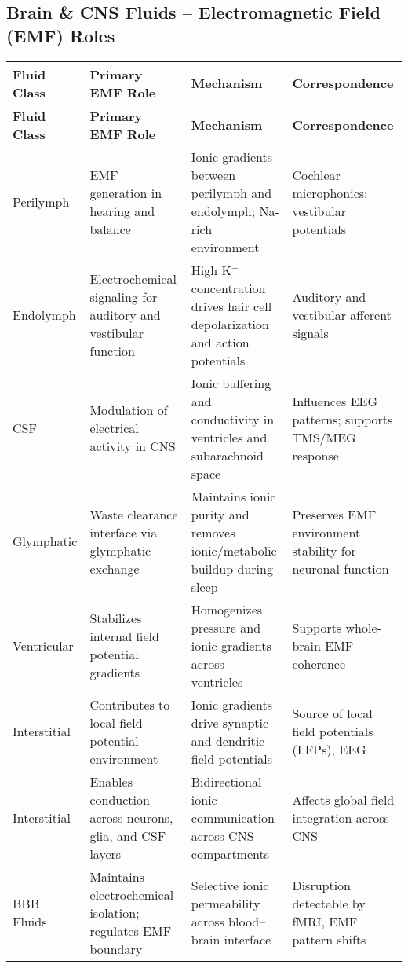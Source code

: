 \documentclass{article}
\begin{document}
\begin{landscape}
\section*{Brain \& CNS Fluids – Electromagnetic Field (EMF) Roles}

\renewcommand{\arraystretch}{1.5}
\begin{longtable}{|>{\raggedright\arraybackslash}p{3.5cm}|>{\raggedright\arraybackslash}p{4.5cm}|>{\raggedright\arraybackslash}p{6cm}|>{\raggedright\arraybackslash}p{5.5cm}|}
\hline
\textbf{Fluid Class} & \textbf{Primary EMF Role} & \textbf{Mechanism} & \textbf{Correspondence} \\
\hline
\endfirsthead
\hline
\textbf{Fluid Class} & \textbf{Primary EMF Role} & \textbf{Mechanism} & \textbf{Correspondence} \\
\hline
\endhead
Perilymph & EMF generation in hearing and balance & Ionic gradients between perilymph and endolymph; Na-rich environment & Cochlear microphonics; vestibular potentials \\
\hline
Endolymph & Electrochemical signaling for auditory and vestibular function & High K$^+$ concentration drives hair cell depolarization and action potentials & Auditory and vestibular afferent signals \\
\hline
CSF & Modulation of electrical activity in CNS & Ionic buffering and conductivity in ventricles and subarachnoid space & Influences EEG patterns; supports TMS/MEG response \\
\hline
Glymphatic & Waste clearance interface via glymphatic exchange & Maintains ionic purity and removes ionic/metabolic buildup during sleep & Preserves EMF environment stability for neuronal function \\
\hline
Ventricular & Stabilizes internal field potential gradients & Homogenizes pressure and ionic gradients across ventricles & Supports whole-brain EMF coherence \\
\hline
Interstitial & Contributes to local field potential environment & Ionic gradients drive synaptic and dendritic field potentials & Source of local field potentials (LFPs), EEG \\
\hline
Interstitial & Enables conduction across neurons, glia, and CSF layers & Bidirectional ionic communication across CNS compartments & Affects global field integration across CNS \\
\hline
BBB Fluids & Maintains electrochemical isolation; regulates EMF boundary & Selective ionic permeability across blood–brain interface & Disruption detectable by fMRI, EMF pattern shifts \\
\hline
\end{longtable}
\end{landscape}
\end{document}
